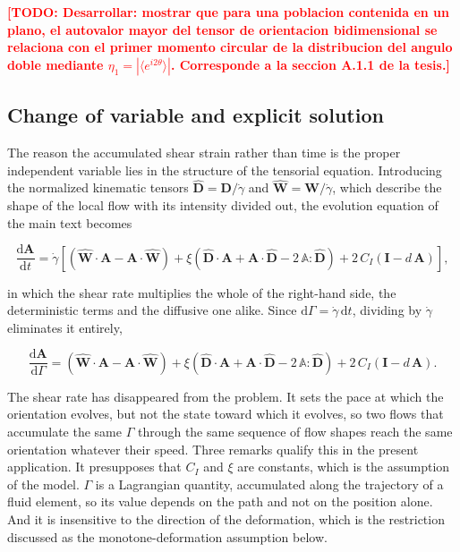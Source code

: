 \documentclass[%
  aip,
  pof,
  reprint,
  floatfix
]{revtex4-2}
\newcommand{\todo}[1]{\textcolor{red}{\textbf{[TODO: #1]}}}
\begin{document}
\todo{Desarrollar: mostrar que para una poblacion contenida en un plano, el autovalor mayor del tensor de orientacion bidimensional se relaciona con el primer momento circular de la distribucion del angulo doble mediante $\eta_1 = |\langle e^{i2\theta}\rangle|$. Corresponde a la seccion A.1.1 de la tesis.}

\subsection{Change of variable and explicit solution}

The reason the accumulated shear strain rather than time is the proper independent variable lies in the structure of the tensorial equation. Introducing the normalized kinematic tensors $\hat{\bm{D}} = \bm{D}/\dot{\gamma}$ and $\hat{\bm{W}} = \bm{W}/\dot{\gamma}$, which describe the shape of the local flow with its intensity divided out, the evolution equation of the main text becomes

\begin{equation}
    \frac{\mathrm{d}\bm{A}}{\mathrm{d}t} = \dot{\gamma}\left[\left(\hat{\bm{W}}\!\cdot\!\bm{A} - \bm{A}\!\cdot\!\hat{\bm{W}}\right) + \xi\left(\hat{\bm{D}}\!\cdot\!\bm{A} + \bm{A}\!\cdot\!\hat{\bm{D}} - 2\,\mathbb{A}\!:\!\hat{\bm{D}}\right) + 2\,C_I\left(\bm{I} - d\,\bm{A}\right)\right],
    \label{eq:sup_factored}
\end{equation}

in which the shear rate multiplies the whole of the right-hand side, the deterministic terms and the diffusive one alike. Since $\mathrm{d}\Gamma = \dot{\gamma}\,\mathrm{d}t$, dividing by $\dot{\gamma}$ eliminates it entirely,

\begin{equation}
    \frac{\mathrm{d}\bm{A}}{\mathrm{d}\Gamma} = \left(\hat{\bm{W}}\!\cdot\!\bm{A} - \bm{A}\!\cdot\!\hat{\bm{W}}\right) + \xi\left(\hat{\bm{D}}\!\cdot\!\bm{A} + \bm{A}\!\cdot\!\hat{\bm{D}} - 2\,\mathbb{A}\!:\!\hat{\bm{D}}\right) + 2\,C_I\left(\bm{I} - d\,\bm{A}\right).
    \label{eq:sup_strain_form}
\end{equation}

The shear rate has disappeared from the problem. It sets the pace at which the orientation evolves, but not the state toward which it evolves, so two flows that accumulate the same $\Gamma$ through the same sequence of flow shapes reach the same orientation whatever their speed. Three remarks qualify this in the present application. It presupposes that $C_I$ and $\xi$ are constants, which is the assumption of the model. $\Gamma$ is a Lagrangian quantity, accumulated along the trajectory of a fluid element, so its value depends on the path and not on the position alone. And it is insensitive to the direction of the deformation, which is the restriction discussed as the monotone-deformation assumption below.
\end{document}
